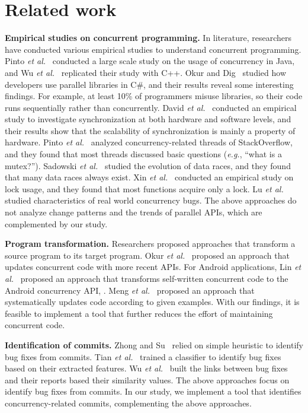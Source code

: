 \section{Related work}
\label{sec:related}
\noindent
\textbf{Empirical studies on concurrent programming.} In literature, researchers have conducted various empirical studies to understand concurrent programming. Pinto \emph{et al.}~\cite{journals/jss/PintoTFFB15} conducted a large scale study on the usage of concurrency in Java, and Wu \emph{et al.}~\cite{journals/infsof/WuCZX16} replicated their study with C++. Okur and Dig~\cite{conf/sigsoft/OkurD12} studied how developers use parallel libraries in C\#, and their results reveal some interesting findings. For example, at least 10\% of programmers misuse libraries, so their code runs sequentially rather than concurrently. David \emph{et al.}~\cite{conf/sosp/DavidGT13} conducted an empirical study to investigate synchronization at both hardware and software levels, and their results show that the scalability of synchronization is mainly a property of hardware. Pinto \emph{et al.}~\cite{conf/oopsla/PintoTC15} analyzed concurrency-related threads of StackOverflow, and they found that most threads discussed basic questions (\emph{e.g.}, ``what is a mutex?''). Sadowski \emph{et al.}~\cite{conf/msr/SadowskiYK12} studied the evolution of data races, and they found that many data races always exist. Xin \emph{et al.}~\cite{conf/icsm/XinQHXZWG13} conducted an empirical study on lock usage, and they found that most functions acquire only a lock. Lu \emph{et al.}~\cite{conf/asplos/LuPSZ08} studied characteristics of real world concurrency bugs. The above approaches do not analyze change patterns and the trends of parallel APIs, which are complemented by our study.

\noindent
\textbf{Program transformation.} Researchers proposed approaches that transform a source program to its target program. Okur \emph{et al.}~\cite{conf/ecoop/OkurED14} proposed an approach that updates concurrent code with more recent APIs. For Android applications, Lin \emph{et al.}~\cite{conf/sigsoft/LinRD14} proposed an approach that transforms self-written concurrent code to the Android concurrency API, . Meng \emph{et al.}~\cite{conf/pldi/MengKM11} proposed an approach that systematically updates code according to given examples. With our findings, it is feasible to implement a tool that further reduces the effort of maintaining concurrent code.

\noindent
\textbf{Identification of commits.} Zhong and Su~\cite{zhong2015bugfix} relied on simple heuristic to identify bug fixes from commits. Tian \emph{et al.}~\cite{tian2012identifying} trained a classifier to identify bug fixes based on their extracted features. Wu \emph{et al.}~\cite{wu2011relink} built the links between bug fixes and their reports based their similarity values. The above approaches focus on identify bug fixes from commits. In our study, we implement a tool that identifies concurrency-related commits, complementing the above approaches. 
